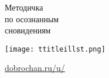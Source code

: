 \documentclass[a5paper,12pt,oneside]{memoir}
\begin{document}
\begin{titlingpage}



\begin{center}
 \begin{Huge}
   \fontsize{35}{35}\selectfont Методичка\\ по осознанным\\сновидениям\\
	\end{Huge}

\hspace{0.5cm}

\texttt{[image: ttitleillst.png]}

\vfill

\normalsize

\url{dobrochan.ru/u/}

{\small{}}

\end{center}

\end{titlingpage}
\end{document}
